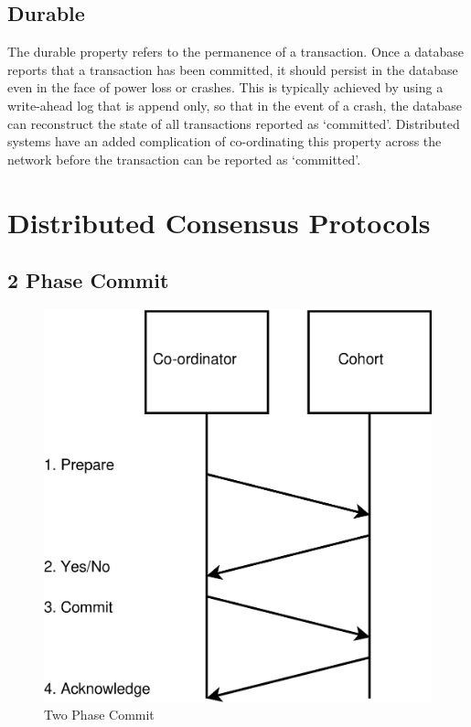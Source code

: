 \documentclass[12pt,twoside,notitlepage]{report}
\begin{document}
\subsection*{Durable}

The durable property refers to the permanence of a transaction. Once a database reports that a
transaction has been committed, it should persist in the database even in the face of power loss or
crashes. This is typically achieved by using a write-ahead log that is append only, so that in the
event of a crash, the database can reconstruct the state of all transactions reported as
`committed'. Distributed systems have an added complication of co-ordinating this property
across the network before the transaction can be reported as `committed'.

\section{Distributed Consensus Protocols}

\subsection*{2 Phase Commit}

\begin{figure}[htb]
\centering
\includegraphics[scale=0.5]{figs/two-pc.eps}
\caption{\label{fig:two-pc}Two Phase Commit}
\end{figure}
\end{document}
